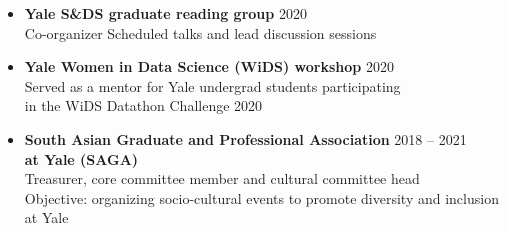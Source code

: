 \documentclass[letterpaper,12pt,oneside]{article}
\theoremstyle{definition}
\begin{document}
\begin{itemize}
				\item[] {\bf Yale S\&DS graduate reading group} \hfill 2020\\
				Co-organizer
				Scheduled talks and lead discussion sessions
				
				\item[] {\bf Yale Women in Data Science (WiDS) workshop} \hfill 2020\\
				Served as a mentor for Yale undergrad students participating \\
				in the
				{WiDS Datathon Challenge 2020}
				
				\item[] {\bf South Asian Graduate and Professional Association} \hfill 2018 -- 2021\\
				{\bf at Yale (SAGA)}\\
				Treasurer, core committee member and cultural committee head\\
				Objective: organizing socio-cultural events to promote diversity and inclusion at Yale
				
				
			\end{itemize}
			
			\vfill
			
\end{document}
